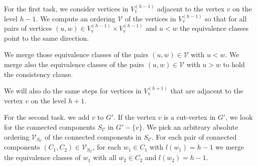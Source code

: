     For the first task, we consider vertices in $V_{\mathrm{v}}^{\left( h - 1 \right)}$ adjacent to the vertex $v$ on the level $h-1$.
    We compute an ordering $\mathcal{V}$ of the vertices in $V_{\mathrm{v}}^{\left( h - 1 \right)} $
    so that for all pairs of vertices $\left( u,w \right)\in V_{\mathrm{v}}^{\left( h - 1 \right)} \times V_{\mathrm{v}}^{\left( h - 1 \right)}$ and $u < w$ the equivalence classes point 
    to the same direction.

    We merge those equivalence classes of the pairs $(u,w) \in \mathcal{V}$ with $u < w$. We merge also the equivalence classes 
    of the pairs $\left( u,w \right) \in \mathcal{V}$ with $u > w$ to hold the consistency clause. 

    We will also do the same steps for vertices in $V_{\mathrm{v}}^{\left( h + 1 \right)}$ that are adjacent to the vertex $v$ on the level $h+1$.

    For the second task. we add $v$ to $G'$. If the vertex $v$ is a cut-vertex in $G'$, we look 
    for the connected components $S_{\mathcal{C}}$ in $G' - \{v\}$. We pick an arbitrary absolute ordering $\mathcal{V}_{S_\mathcal{C}}$ of the connected components in $S_{\mathcal{C}}$. 
    For each pair of connected components $\left(  C_1, C_2\right) \in \mathcal{V}_{S_\mathcal{C}}$, for each $w_1 \in C_1$ with $l(w_1) = h-1$ we merge 
    the equivalence classes of $w_1$ with all $w_2 \in C_2$ and $l(w_2) = h-1$. 




%
%
%
